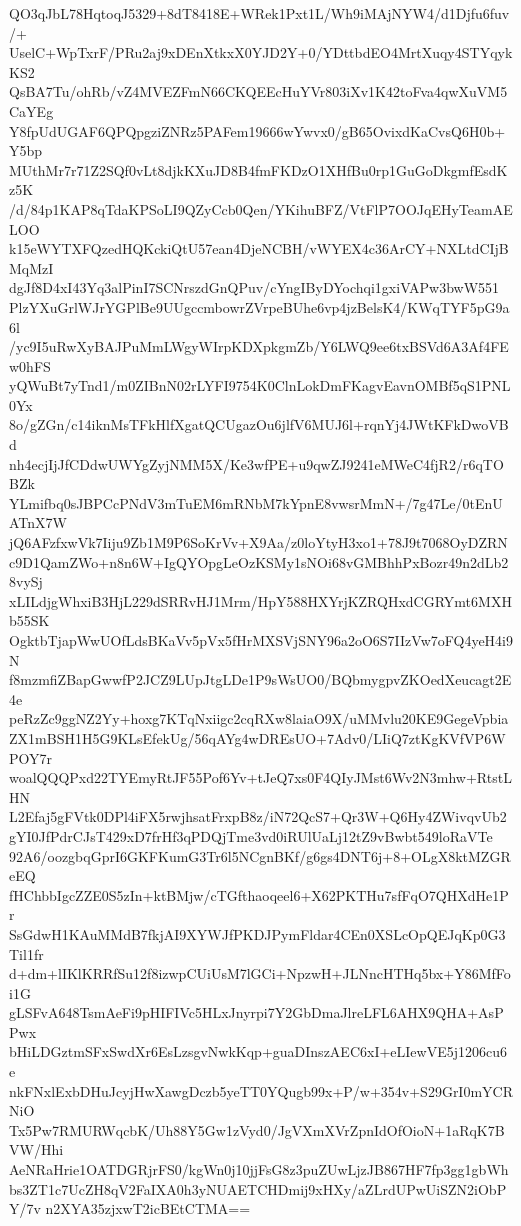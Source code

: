 QO3qJbL78HqtoqJ5329+8dT8418E+WRek1Pxt1L/Wh9iMAjNYW4/d1Djfu6fuv/+
UselC+WpTxrF/PRu2aj9xDEnXtkxX0YJD2Y+0/YDttbdEO4MrtXuqy4STYqykKS2
QsBA7Tu/ohRb/vZ4MVEZFmN66CKQEEcHuYVr803iXv1K42toFva4qwXuVM5CaYEg
Y8fpUdUGAF6QPQpgziZNRz5PAFem19666wYwvx0/gB65OvixdKaCvsQ6H0b+Y5bp
MUthMr7r71Z2SQf0vLt8djkKXuJD8B4fmFKDzO1XHfBu0rp1GuGoDkgmfEsdKz5K
/d/84p1KAP8qTdaKPSoLI9QZyCcb0Qen/YKihuBFZ/VtFlP7OOJqEHyTeamAELOO
k15eWYTXFQzedHQKckiQtU57ean4DjeNCBH/vWYEX4c36ArCY+NXLtdCIjBMqMzI
dgJf8D4xI43Yq3alPinI7SCNrszdGnQPuv/cYngIByDYochqi1gxiVAPw3bwW551
PlzYXuGrlWJrYGPlBe9UUgccmbowrZVrpeBUhe6vp4jzBelsK4/KWqTYF5pG9a6l
/yc9I5uRwXyBAJPuMmLWgyWIrpKDXpkgmZb/Y6LWQ9ee6txBSVd6A3Af4FEw0hFS
yQWuBt7yTnd1/m0ZIBnN02rLYFI9754K0ClnLokDmFKagvEavnOMBf5qS1PNL0Yx
8o/gZGn/c14iknMsTFkHlfXgatQCUgazOu6jlfV6MUJ6l+rqnYj4JWtKFkDwoVBd
nh4ecjIjJfCDdwUWYgZyjNMM5X/Ke3wfPE+u9qwZJ9241eMWeC4fjR2/r6qTOBZk
YLmifbq0sJBPCcPNdV3mTuEM6mRNbM7kYpnE8vwsrMmN+/7g47Le/0tEnUATnX7W
jQ6AFzfxwVk7Iiju9Zb1M9P6SoKrVv+X9Aa/z0loYtyH3xo1+78J9t7068OyDZRN
c9D1QamZWo+n8n6W+IgQYOpgLeOzKSMy1sNOi68vGMBhhPxBozr49n2dLb28vySj
xLILdjgWhxiB3HjL229dSRRvHJ1Mrm/HpY588HXYrjKZRQHxdCGRYmt6MXHb55SK
OgktbTjapWwUOfLdsBKaVv5pVx5fHrMXSVjSNY96a2oO6S7IIzVw7oFQ4yeH4i9N
f8mzmfiZBapGwwfP2JCZ9LUpJtgLDe1P9sWsUO0/BQbmygpvZKOedXeucagt2E4e
peRzZc9ggNZ2Yy+hoxg7KTqNxiigc2cqRXw8laiaO9X/uMMvlu20KE9GegeVpbia
ZX1mBSH1H5G9KLsEfekUg/56qAYg4wDREsUO+7Adv0/LIiQ7ztKgKVfVP6WPOY7r
woalQQQPxd22TYEmyRtJF55Pof6Yv+tJeQ7xs0F4QIyJMst6Wv2N3mhw+RtstLHN
L2Efaj5gFVtk0DPl4iFX5rwjhsatFrxpB8z/iN72QcS7+Qr3W+Q6Hy4ZWivqvUb2
gYI0JfPdrCJsT429xD7frHf3qPDQjTme3vd0iRUlUaLj12tZ9vBwbt549loRaVTe
92A6/oozgbqGprI6GKFKumG3Tr6l5NCgnBKf/g6gs4DNT6j+8+OLgX8ktMZGReEQ
fHChbbIgcZZE0S5zIn+ktBMjw/cTGfthaoqeel6+X62PKTHu7sfFqO7QHXdHe1Pr
SsGdwH1KAuMMdB7fkjAI9XYWJfPKDJPymFldar4CEn0XSLcOpQEJqKp0G3Til1fr
d+dm+lIKlKRRfSu12f8izwpCUiUsM7lGCi+NpzwH+JLNncHTHq5bx+Y86MfFoi1G
gLSFvA648TsmAeFi9pHIFIVc5HLxJnyrpi7Y2GbDmaJlreLFL6AHX9QHA+AsPPwx
bHiLDGztmSFxSwdXr6EsLzsgvNwkKqp+guaDInszAEC6xI+eLIewVE5j1206cu6e
nkFNxlExbDHuJcyjHwXawgDczb5yeTT0YQugb99x+P/w+354v+S29GrI0mYCRNiO
Tx5Pw7RMURWqcbK/Uh88Y5Gw1zVyd0/JgVXmXVrZpnIdOfOioN+1aRqK7BVW/Hhi
AeNRaHrie1OATDGRjrFS0/kgWn0j10jjFsG8z3puZUwLjzJB867HF7fp3gg1gbWh
bs3ZT1c7UcZH8qV2FaIXA0h3yNUAETCHDmij9xHXy/aZLrdUPwUiSZN2iObPY/7v
n2XYA35zjxwT2icBEtCTMA==

